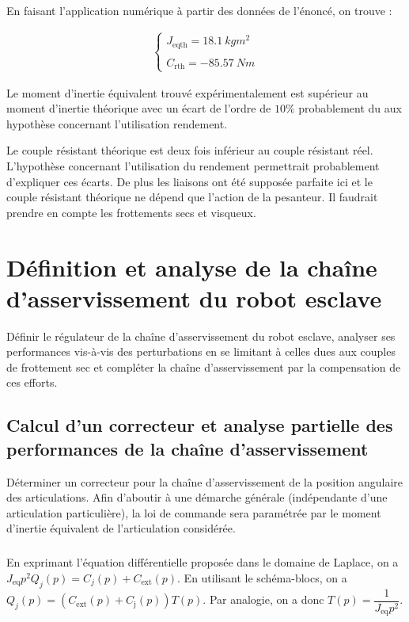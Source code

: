 \documentclass[10pt,fleqn]{article} %
\begin{document}
\subparagraph{}%

En faisant l'application numérique à partir des données de l'énoncé, on trouve : 

\begin{align*}
\left\{
\begin{array}{c}
J_{\text{eqth}}=\SI{18,1}{kg m^2}\\
\\
C_{\text{rth}}=-\SI{85,57}{N m}
\end{array}
\right.
\end{align*}

Le moment d'inertie équivalent trouvé expérimentalement est supérieur au moment d'inertie théorique avec un écart de l'ordre de $10\%$ probablement du aux hypothèse concernant l'utilisation rendement.

Le couple résistant théorique est deux fois inférieur au couple résistant réel. L'hypothèse concernant l'utilisation du rendement permettrait probablement d'expliquer ces écarts. De plus les liaisons ont été supposée parfaite ici et le couple résistant théorique ne dépend que l'action de la pesanteur. Il faudrait prendre en compte les frottements secs et visqueux. 

\section{Définition et analyse de la chaîne d’asservissement du robot esclave}
\begin{obj}
Définir le régulateur de la chaîne d’asservissement du robot esclave, analyser ses performances vis-à-vis
des perturbations en se limitant à celles dues aux couples de frottement sec et compléter la chaîne
d’asservissement par la compensation de ces efforts.
\end{obj}

\subsection{Calcul d’un correcteur et analyse partielle des performances de la chaîne d’asservissement}
\begin{obj}
Déterminer un correcteur pour la chaîne d’asservissement de la position angulaire des articulations.
Afin d’aboutir à une démarche générale (indépendante d’une articulation particulière), la loi de commande
sera paramétrée par le moment d’inertie équivalent de l’articulation considérée.
\end{obj}

\subparagraph{}%
En exprimant l'équation différentielle proposée dans le domaine de Laplace, on a 
$J_{\text{eq}} p^2{Q}_j(p)=C_j(p)+C_{\text{ext}}(p)$.
En utilisant le schéma-blocs, on a $Q_j(p)=\left(C_{\text{ext}}(p)+C_{\text{j}}(p)\right)T(p)$. 
Par analogie, on a donc $T(p)=\dfrac{1}{J_{\text{eq}}p^2}$.
\end{document}
